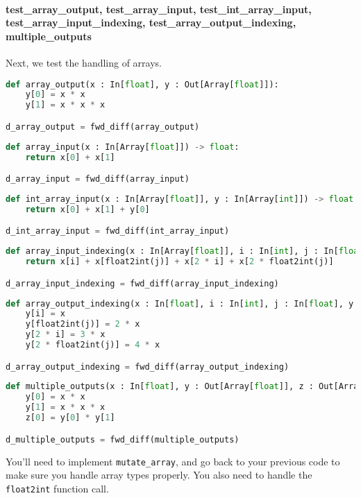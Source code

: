 \paragraph{test_array_output, test_array_input, test_int_array_input, test_array_input_indexing, test_array_output_indexing, multiple_outputs} Next, we test the handling of arrays.
\begin{lstlisting}[language=Python]
def array_output(x : In[float], y : Out[Array[float]]):
    y[0] = x * x
    y[1] = x * x * x

d_array_output = fwd_diff(array_output)
\end{lstlisting}
\begin{lstlisting}[language=Python]
def array_input(x : In[Array[float]]) -> float:
    return x[0] + x[1]

d_array_input = fwd_diff(array_input)
\end{lstlisting}
\begin{lstlisting}[language=Python]
def int_array_input(x : In[Array[float]], y : In[Array[int]]) -> float:
    return x[0] + x[1] + y[0]

d_int_array_input = fwd_diff(int_array_input)
\end{lstlisting}
\begin{lstlisting}[language=Python]
def array_input_indexing(x : In[Array[float]], i : In[int], j : In[float]) -> float:
    return x[i] + x[float2int(j)] + x[2 * i] + x[2 * float2int(j)]

d_array_input_indexing = fwd_diff(array_input_indexing)
\end{lstlisting}
\begin{lstlisting}[language=Python]
def array_output_indexing(x : In[float], i : In[int], j : In[float], y : Out[Array[float]]):
    y[i] = x
    y[float2int(j)] = 2 * x
    y[2 * i] = 3 * x
    y[2 * float2int(j)] = 4 * x

d_array_output_indexing = fwd_diff(array_output_indexing)
\end{lstlisting}
\begin{lstlisting}[language=Python]
def multiple_outputs(x : In[float], y : Out[Array[float]], z : Out[Array[float]]):
    y[0] = x * x
    y[1] = x * x * x
    z[0] = y[0] * y[1]

d_multiple_outputs = fwd_diff(multiple_outputs)
\end{lstlisting}
You'll need to implement \lstinline{mutate_array}, and go back to your previous code to make sure you handle array types properly. You also need to handle the \lstinline{float2int} function call.

